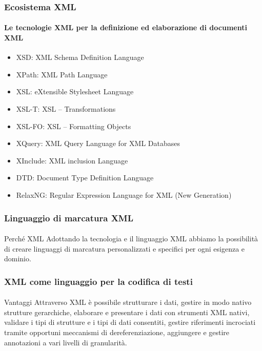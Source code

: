 \begin{frame}
	\frametitle{Ecosistema XML}
	\framesubtitle{Le tecnologie XML per la definizione ed elaborazione di documenti XML}
	\addtocounter{nframe}{1}

	\begin{itemize}
		\item XSD: XML Schema Definition Language
		\item XPath: XML Path Language
		\item XSL: eXtensible Stylesheet Language
		\item XSL-T:  XSL – Transformations
		\item XSL-FO: XSL – Formatting Objects
		\item XQuery: XML Query Language for XML Databases
		\item XInclude: XML inclusion Language
		\item DTD: Document Type Definition Language
		\item RelaxNG: Regular Expression Language for XML (New Generation)
	\end{itemize}

\end{frame}


\begin{frame}
	\frametitle{Linguaggio di marcatura XML}
	\framesubtitle{}
	\addtocounter{nframe}{1}

	\begin{block}{Perché XML}
		Adottando la tecnologia e il linguaggio XML abbiamo la possibilità di creare linguaggi di marcatura personalizzati e specifici per ogni esigenza e dominio.
	\end{block}

\end{frame}

\begin{frame}
	\frametitle{XML come linguaggio per la codifica di testi}
	\framesubtitle{}
	\addtocounter{nframe}{1}

	\begin{block}{Vantaggi}
		Attraverso XML è possibile strutturare i dati, gestire in modo nativo strutture gerarchiche, elaborare e presentare i dati con strumenti XML nativi, validare i tipi di strutture e i tipi di dati consentiti, gestire riferimenti incrociati tramite opportuni meccanismi di dereferenziazione, aggiungere e gestire annotazioni a vari livelli di granularità.
	\end{block}


\end{frame}
